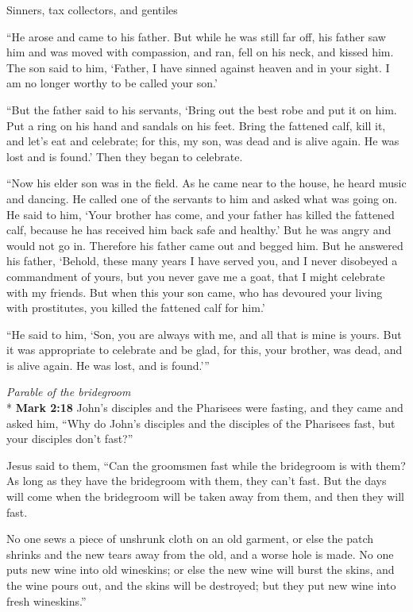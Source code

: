 \documentclass[10pt,a5paper,twoside]{article}
\newcommand{\quotesize}{\normalsize{}}
\newenvironment{quotetext}{\begingroup\quotesize}{\endgroup}
\newcommand{\intex}[1]{\index[texts]{#1}}
\newcommand{\bible}[2]{\begin{quotetext}\textbf{#1}\intex{#1} #2\end{quotetext}}
\newcommand{\gospelmark}[2]{\bible{Mark #1}{#2}}
\newcommand{\subhead}[1]{\emph{#1}\\*}
\begin{document}
\begin{section}{Sinners, tax collectors, and gentiles}
{   ``He arose and came to his father. But while he was still far off, his father saw him and was moved with compassion, and ran, fell on his neck, and kissed him.    The son said to him, `Father, I have sinned against heaven and in your sight. I am no longer worthy to be called your son.'

   ``But the father said to his servants, `Bring out the best robe and put it on him. Put a ring on his hand and sandals on his feet.    Bring the fattened calf, kill it, and let's eat and celebrate;    for this, my son, was dead and is alive again. He was lost and is found.' Then they began to celebrate.

   ``Now his elder son was in the field. As he came near to the house, he heard music and dancing.    He called one of the servants to him and asked what was going on.    He said to him, `Your brother has come, and your father has killed the fattened calf, because he has received him back safe and healthy.'    But he was angry and would not go in. Therefore his father came out and begged him.    But he answered his father, `Behold, these many years I have served you, and I never disobeyed a commandment of yours, but you never gave me a goat, that I might celebrate with my friends.    But when this your son came, who has devoured your living with prostitutes, you killed the fattened calf for him.'

   ``He said to him, `Son, you are always with me, and all that is mine is yours.    But it was appropriate to celebrate and be glad, for this, your brother, was dead, and is alive again. He was lost, and is found.'{}'' 
}

\subhead{Parable of the bridegroom}
\gospelmark{2:18}{John's disciples and the Pharisees were fasting, and they came and asked him, ``Why do John's disciples and the disciples of the Pharisees fast, but your disciples don't fast?''

  Jesus said to them, ``Can the groomsmen fast while the bridegroom is with them? As long as they have the bridegroom with them, they can't fast.    But the days will come when the bridegroom will be taken away from them, and then they will fast.

    No one sews a piece of unshrunk cloth on an old garment, or else the patch shrinks and the new tears away from the old, and a worse hole is made.    No one puts new wine into old wineskins; or else the new wine will burst the skins, and the wine pours out, and the skins will be destroyed; but they put new wine into fresh wineskins.'' }


\end{section}
\end{document}
